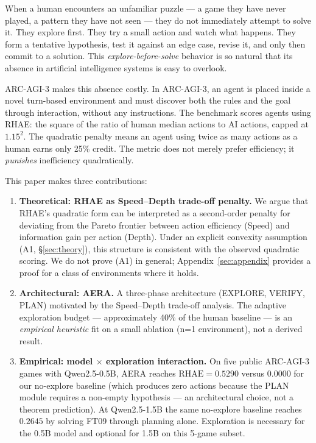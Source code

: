 \documentclass[11pt]{article}
\begin{document}
When a human encounters an unfamiliar puzzle --- a game they have never played, a pattern they have not seen --- they do not immediately attempt to solve it. They explore first. They try a small action and watch what happens. They form a tentative hypothesis, test it against an edge case, revise it, and only then commit to a solution. This \emph{explore-before-solve} behavior is so natural that its absence in artificial intelligence systems is easy to overlook.

ARC-AGI-3 makes this absence costly. In ARC-AGI-3, an agent is placed inside a novel turn-based environment and must discover both the rules and the goal through interaction, without any instructions. The benchmark scores agents using RHAE: the square of the ratio of human median actions to AI actions, capped at $1.15^2$. The quadratic penalty means an agent using twice as many actions as a human earns only 25\% credit. The metric does not merely prefer efficiency; it \emph{punishes} inefficiency quadratically.

This paper makes three contributions:

\begin{enumerate}[leftmargin=*]
\item \textbf{Theoretical: RHAE as Speed--Depth trade-off penalty.} We argue that RHAE's quadratic form can be interpreted as a second-order penalty for deviating from the Pareto frontier between action efficiency (Speed) and information gain per action (Depth). Under an explicit convexity assumption (A1, \S\ref{sec:theory}), this structure is consistent with the observed quadratic scoring. We do not prove (A1) in general; Appendix~\ref{sec:appendix} provides a proof for a class of environments where it holds.
\item \textbf{Architectural: AERA.} A three-phase architecture (EXPLORE, VERIFY, PLAN) motivated by the Speed--Depth trade-off analysis. The adaptive exploration budget --- approximately 40\% of the human baseline --- is an \emph{empirical heuristic} fit on a small ablation (n=1 environment), not a derived result.
\item \textbf{Empirical: model $\times$ exploration interaction.} On five public ARC-AGI-3 games with Qwen2.5-0.5B, AERA reaches $\text{RHAE}=0.5290$ versus $0.0000$ for our no-explore baseline (which produces zero actions because the PLAN module requires a non-empty hypothesis --- an architectural choice, not a theorem prediction). At Qwen2.5-1.5B the same no-explore baseline reaches $0.2645$ by solving FT09 through planning alone. Exploration is necessary for the 0.5B model and optional for 1.5B on this 5-game subset.
\end{enumerate}
\end{document}
